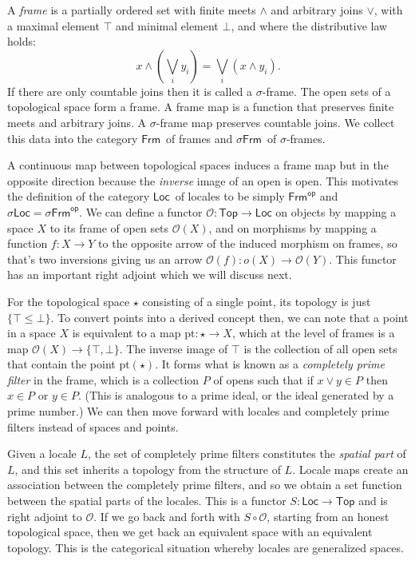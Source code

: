 \documentclass[12pt]{article}
\newcommand{\op}[1]{#1^{\textsf{op}}}
\newcommand{\bottom}{\ensuremath{\bot}}
\newcommand{\Frm}{\ensuremath{\mathsf{Frm}}}
\newcommand{\sFrm}{\ensuremath{\mathsf{\sigma Frm}}}
\newcommand{\Locale}{\ensuremath{\mathsf{Loc}}}
\newcommand{\Top}{\ensuremath{\mathsf{Top}}}
\newcommand{\sLocale}{\ensuremath{\mathsf{\sigma Loc}}}
\renewcommand{\o}{\ensuremath{\mathcal{O}}}
\begin{document}
A \emph{frame} is a partially ordered set with finite meets $\wedge$ and arbitrary joins $\vee$, with a maximal element $\top$ and minimal element $\bottom$, and where the distributive law holds: $$x \wedge (\bigvee_i y_i)=\bigvee_i (x\wedge y_i).$$ If there are only countable joins then it is called a $\sigma$-frame. The open sets of a topological space form a frame. A frame map is a function that preserves finite meets and arbitrary joins. A $\sigma$-frame map preserves countable joins. We collect this data into the category \Frm\ of frames and \sFrm\ of $\sigma$-frames.

A continuous map between topological spaces induces a frame map but in the opposite direction because the \emph{inverse} image of an open is open. This motivates the definition of the category \Locale\ of locales to be simply $\op{\Frm}$ and $\sLocale=\op{\sFrm}$. We can define a functor $\o:\Top\to\Locale$ on objects by mapping a space $X$ to its frame of open sets $\o(X)$, and on morphisms by mapping a function $f:X\to Y$ to the opposite arrow of the induced morphism on frames, so that's two inversions giving us an arrow $\o(f):o(X)\to \o(Y)$. This functor has an important right adjoint which we will discuss next.

For the topological space $\star$ consisting of a single point, its topology is just $\{\top \leq \bot\}$. To convert points into a derived concept then, we can note that a point in a space $X$ is equivalent to a map $\mathrm{pt}:\star\to X$, which at the level of frames is a map $\o(X)\to\{\top, \bot\}$. The inverse image of $\top$ is the collection of all open sets that contain the point $\mathrm{pt}(\star)$. It forms what is known as a \emph{completely prime filter} in the frame, which is a collection $P$ of opens such that if $x\vee y\in P$ then $x\in P$ or $y\in P$. (This is analogous to a prime ideal, or the ideal generated by a prime number.) We can then move forward with locales and completely prime filters instead of spaces and points. 

Given a locale $L$, the set of completely prime filters constitutes the \emph{spatial part} of $L$, and this set inherits a topology from the structure of $L$. Locale maps create an association between the completely prime filters, and so we obtain a set function between the spatial parts of the locales. This is a functor $S:\Locale\to\Top$ and is right adjoint to $\o$. If we go back and forth with $S\circ \o$, starting from an honest topological space, then we get back an equivalent space with an equivalent topology. This is the categorical situation whereby locales are generalized spaces.
\end{document}
